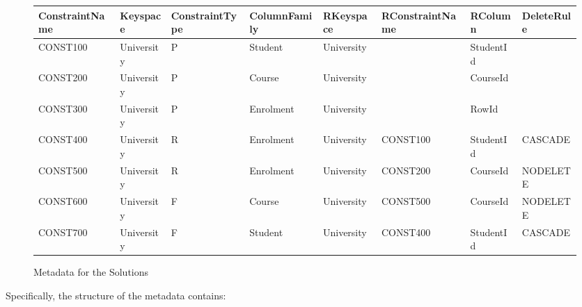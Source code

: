 \begin{figure}[h]
	\centering
	
	\begin{tabular}{CCC CCC CC}
		\toprule
		\bfseries ConstraintName & \bfseries Keyspace & \bfseries ConstraintType &
		\bfseries ColumnFamily & \bfseries RKeyspace & \bfseries RConstraintName &
		\bfseries RColumn & \bfseries DeleteRule\\
		\midrule
		CONST100 & University & P & Student & University & & StudentId &\\
		\rc CONST200 & University & P & Course & University & & CourseId &\\
		CONST300 & University & P & Enrolment & University & & RowId &\\
		\rc CONST400 & University & R & Enrolment & University & CONST100 & StudentId
		& CASCADE\\
		CONST500 & University & R & Enrolment & University & CONST200 & CourseId &
		NODELETE\\
		\rc CONST600 & University & F & Course & University & CONST500 & CourseId &
		NODELETE\\
		CONST700 & University & F & Student & University & CONST400 & StudentId &
		CASCADE\\
		\bottomrule
	\end{tabular}
	\caption{Metadata for the Solutions}\label{f:metadataInSolutions}
\end{figure}


Specifically, the structure of the metadata contains:

